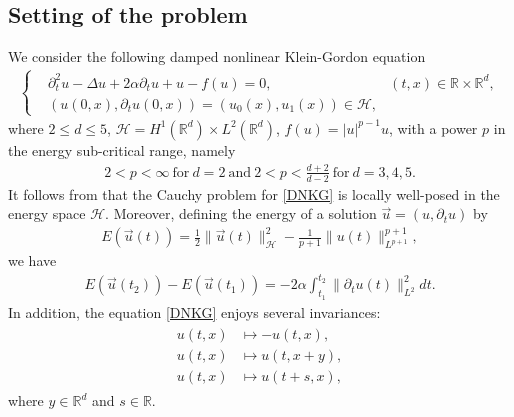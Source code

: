 \documentclass[reqno]{amsart}
\theoremstyle{plain}
\theoremstyle{definition}
\numberwithin{equation}{section}
\renewcommand{\r}{\right}
\newcommand{\1}{\mathbbm{1}}
\begin{document}
\subsection{Setting of the problem}
We consider the following damped nonlinear Klein-Gordon equation
\begin{align}
\label{DNKG}
\tag{DNKG}
	\left\{
	\begin{aligned}
		&\partial_{t}^2u-\Delta u+2\alpha \partial_{t}u+u-f(u)=0, & (t,x) \in \mathbb{R} \times \mathbb{R}^d,
		\\
		&\left(u(0,x),{\partial}_tu(0,x)\right)=\left(u_{0}(x), u_1(x)\right)\in \mathcal{H},
	\end{aligned}
	\r.
\end{align}
where $2\leq d\leq 5$,  $\mathcal{H}=H^1(\mathbb{R}^d)\times L^2(\mathbb{R}^d)$, $f(u)=|u|^{p-1}u$, with a power $p$ in the energy sub-critical range, namely
\begin{align*}
2<p<\infty \ \mbox{for}\ d=2\ \mbox{and}\ 2<p<\frac{d+2}{d-2}\ \mbox{for}\ d=3,4,5.
\end{align*}
It follows from \cite{BRS} that the Cauchy problem for \eqref{DNKG} is locally well-posed in the energy space $\mathcal{H}$. Moreover, defining the energy of a solution $\vec{u}=(u, {\partial}_tu)$ by
\begin{align*}
E(\vec{u}(t))=\frac{1}{2}\|\vec{u}(t)\|_{\mathcal{H}}^2-\frac{1}{p+1}\| u(t)\|_{L^{p+1}}^{p+1},
\end{align*}
we have
\begin{align}\label{energydecay}
E(\vec{u}(t_2))-E(\vec{u}(t_1))=-2\alpha \int_{t_1}^{t_2} \| {\partial}_tu(t)\|_{L^2}^2dt.
\end{align}
In addition, the equation \eqref{DNKG} enjoys several invariances:
\begin{align}\label{invariance}
\begin{aligned}
u(t,x)&\mapsto -u(t,x),
\\
u(t,x)&\mapsto u(t,x+y),
\\
u(t,x)&\mapsto u(t+s,x),
\end{aligned}
\end{align}
where $y\in \mathbb{R}^d$ and $s\in \mathbb{R}$.
\end{document}
